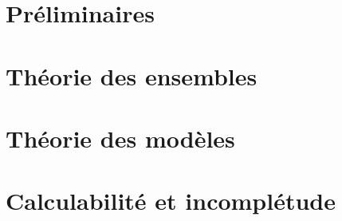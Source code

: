 \documentclass[11pt, a4paper, french]{book}
\begin{document}
	
	
	
	
	
	
	
	\mainmatter
	
	
	
	\part{Préliminaires}\label{part.preli}
	
	

	

    

    

    


    \part{Théorie des ensembles}\label{part.tde}

    

    

    

    

    
	
	
	\part{Théorie des modèles}\label{part.tdm}
	
	


    \part{Calculabilité et incomplétude}\label{part.calc}
\end{document}
